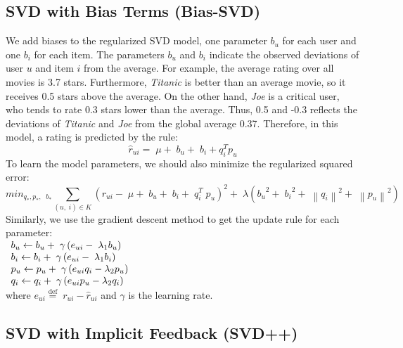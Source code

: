 \documentclass[conference]{IEEEtran}
\begin{document}
\subsection{SVD with Bias Terms (Bias-SVD)}
We add biases to the regularized SVD model, one parameter $b_u$ for each user and one $b_i$ for each item. The parameters $b_u$ and $b_i$ indicate the observed deviations of user $u$ and item $i$ from the average. For example, the average rating over all movies is 3.7 stars. Furthermore, \emph{Titanic} is better than an average movie, so it receives 0.5 stars above the average. On the other hand, \emph{Joe} is a critical user, who tends to rate 0.3 stars lower than the average. Thus, 0.5 and -0.3 reflects the deviations of \emph{Titanic} and \emph{Joe} from the global average 0.37. Therefore, in this model,
a rating is predicted by the rule:
\begin{equation}
{\hat r_{ui}} = \;\mu  + \;{b_u} + \;{b_i} + q_i^T{p_u}
\label{eq: SVD}
\end{equation}
To learn the model parameters, we should also minimize the regularized squared error:
\begin{equation}
mi{n_{{q_*},{p_*},\;\;{b_*}}}\mathop \sum \limits_{\left( {u,\;i} \right) \in K} {\left( {{r_{ui}} - \;\mu  + \;{b_u} + \;{b_i} + \;q_i^T\;{p_u}} \right)^2} + \;\lambda \left( {{b_u}^2 + \;{b_i}^2 + \;{{\left\| {{q_i}} \right\|}^2} + \;{{\left\| {{p_u}} \right\|}^2}} \right)
\end{equation}
Similarly, we use the gradient descent method to get the update rule for each parameter:
\\
$
\begin{array}{l}{b_u} \leftarrow {b_u} + {\rm{\;}}\gamma \left( {{e_{ui}} - {\rm{\;}}{\lambda _1}{b_u}} \right)\\{b_i} \leftarrow {b_i} + {\rm{\;}}\gamma \left( {{e_{ui}} - {\rm{\;}}{\lambda _1}{b_i}} \right)\\{p_u} \leftarrow {p_u} + {\rm{\;}}\gamma \left( {{e_{ui}}{q_i} - {\lambda _2}{p_u}} \right)\\{q_i} \leftarrow {q_i} + {\rm{\;}}\gamma \left( {{e_{ui}}{p_u} - {\lambda _2}{q_i}} \right)\end{array}
$
\\
where ${e_{ui}} \stackrel{\text{def}}{=} \;{r_{ui}} - \hat r_{ui}$ and $\gamma$ is the learning rate.

\subsection{SVD with Implicit Feedback (SVD++)}
\end{document}
